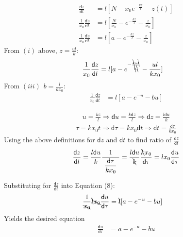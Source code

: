 \documentclass[a4paper]{article}
\newenvironment{aside}
  {\begin{mdframed}[style=0,%
      leftline=false,rightline=false,leftmargin=2em,rightmargin=2em,%
          innerleftmargin=0pt,innerrightmargin=0pt,linewidth=0.5pt,%
      skipabove=7pt,skipbelow=7pt]\footnotesize}
  {\end{mdframed}}
\begin{document}
\begin{align*}
  \frac{\mathsf{d}z}{\mathsf{d}t} &= l[N - x_{0}e^{-\frac{kz}{l}} - z(t)]						\\
  \frac{1}{x_{0}}\frac{\mathsf{d}z}{\mathsf{d}t} &= l[\frac{N}{x_{0}} - e^{-\frac{kz}{l}} - \frac{z}{x_{0}}]	\\		
  \frac{1}{x_{0}}\frac{\mathsf{d}z}{\mathsf{d}t} &= l[a - e^{-\frac{kz}{l}} - \frac{z}{x_{0}}]			
\end{align*}
From $(i)$ above, $z = \frac{ul}{k}$:
\begin{align}
  \frac{1}{x_{0}}\frac{\mathsf{d}z}{\mathsf{d}t} &= l[a - e^{-\frac{\bcancel{k}u\bcancel{l}}{\bcancel{k}\bcancel{l}}} - \frac{ul}{kx_{0}}]			
\end{align}
From $ (iii) \hspace{5pt} b = \frac{l}{kx_{0}}$:
\begin{align}
  \frac{1}{x_{0}}\frac{\mathsf{d}z}{\mathsf{d}t} &= l[a - e^{-u} - bu] 			
\end{align}

\begin{aside}
  \begin{align*}
     u = \frac{kz}{l} \Longrightarrow \mathsf{d}u = \frac{k \mathsf{d}z}{l} \Longrightarrow \mathsf{d}z = \frac{l \mathsf{d}u}{k}	
  \end{align*}
  \begin{align*}
     \tau = kx_{0}t \Longrightarrow \mathsf{d}\tau = kx_{0}\mathsf{d}t \Longrightarrow \mathsf{d}t = \frac{\mathsf{d}\tau}{kx_{0}} 
  \end{align*}
  Using the above definitions for $\mathsf{d}z$ and $\mathsf{d}t$ to find ratio of $\frac{\mathsf{d}z}{\mathsf{d}t}$
  \begin{align*}
     \frac{\mathsf{d}z}{\mathsf{d}t} = \dfrac{l \mathsf{d}u}{k} \dfrac{\quad 1 \quad}{\dfrac{\mathsf{d}\tau}{kx_{0}}} =  \dfrac{l \mathsf{d}u}{\bcancel{k}} \dfrac{\bcancel{k}x_{0}}{\mathsf{d}\tau} = l x_{0} \frac{\mathsf{d}u}{\mathsf{d}\tau}
  \end{align*}
\end{aside}
Substituting for $\frac{\mathsf{d}z}{\mathsf{d}t}$ into Equation (8):
\begin{align*}
  \frac{1}{\bcancel{x_{0}}}\bcancel{l} \bcancel{x_{0}}\frac{ \mathsf{d}u}{\mathsf{d}\tau} &= \bcancel{l}[a - e^{-u} - bu] 			
\end{align*}
Yields the desired equation
\begin{align}
  \frac{\mathsf{d}u}{\mathsf{d}\tau} &= a - e^{-u} - bu 			
\end{align}
\end{document}
